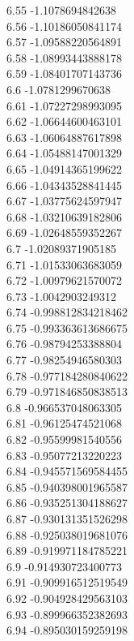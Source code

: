 {6.55	-1.1078694842638\\
6.56	-1.10186050841174\\
6.57	-1.09588220564891\\
6.58	-1.08993443888178\\
6.59	-1.08401707143736\\
6.6	-1.0781299670638\\
6.61	-1.07227298993095\\
6.62	-1.06644600463101\\
6.63	-1.06064887617898\\
6.64	-1.05488147001329\\
6.65	-1.04914365199622\\
6.66	-1.04343528841445\\
6.67	-1.03775624597947\\
6.68	-1.03210639182806\\
6.69	-1.02648559352267\\
6.7	-1.02089371905185\\
6.71	-1.01533063683059\\
6.72	-1.00979621570072\\
6.73	-1.0042903249312\\
6.74	-0.998812834218462\\
6.75	-0.993363613686675\\
6.76	-0.98794253388804\\
6.77	-0.98254946580303\\
6.78	-0.977184280840622\\
6.79	-0.971846850838513\\
6.8	-0.966537048063305\\
6.81	-0.96125474521068\\
6.82	-0.95599981540556\\
6.83	-0.95077213220223\\
6.84	-0.945571569584455\\
6.85	-0.940398001965587\\
6.86	-0.935251304188627\\
6.87	-0.930131351526298\\
6.88	-0.925038019681076\\
6.89	-0.919971184785221\\
6.9	-0.914930723400773\\
6.91	-0.909916512519549\\
6.92	-0.904928429563103\\
6.93	-0.899966352382693\\
6.94	-0.895030159259198\\
}
